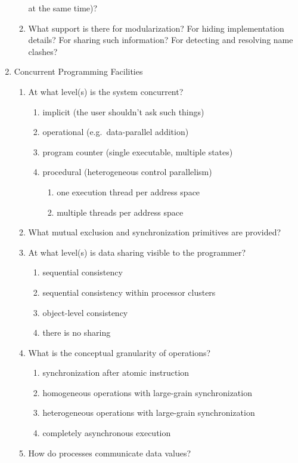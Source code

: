 \begin{enumerate}
\begin{enumerate}
	at the same time)?
  \item What support is there for modularization?
	For hiding implementation details?
	For sharing such information?
	For detecting and resolving name clashes?
  \end{enumerate}
\item Concurrent Programming Facilities
  \begin{enumerate}
  \item At what level(s) is the system concurrent?
    \begin{enumerate}
    \item implicit (the user shouldn't ask such things)
    \item operational (e.g.\ data-parallel addition)
    \item program counter (single executable, multiple states)
    \item procedural (heterogeneous control parallelism)
      \begin{enumerate}
      \item one execution thread per address space
      \item multiple threads per address space
      \end{enumerate}
    \end{enumerate}
  \item What mutual exclusion and synchronization primitives are provided?
  \item At what level(s) is data sharing visible to the programmer?
    \begin{enumerate}
    \item sequential consistency
    \item sequential consistency within processor clusters
    \item object-level consistency
    \item there is no sharing
    \end{enumerate}
  \item What is the conceptual granularity of operations?
    \begin{enumerate}
    \item synchronization after atomic instruction
    \item homogeneous operations with large-grain synchronization
    \item heterogeneous operations with large-grain synchronization
    \item completely asynchronous execution
    \end{enumerate}
  \item How do processes communicate data values?

\end{enumerate}
\end{enumerate}
